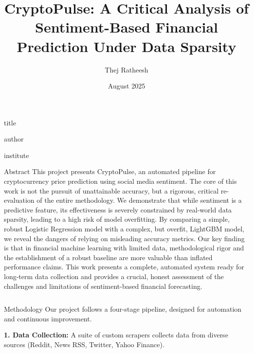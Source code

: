 \documentclass[final]{beamer}
\title{CryptoPulse: A Critical Analysis of Sentiment-Based Financial Prediction Under Data Sparsity}
\author{Thej Ratheesh}
\institute{University College Dublin, School of Mathematics and Statistics}
\date{August 2025}
\begin{document}
\begin{frame}[t]
  \begin{beamercolorbox}[wd=\linewidth, center]{title}
    \inserttitle
  \end{beamercolorbox}
  \begin{beamercolorbox}[wd=\linewidth, center]{author}
    \insertauthor
  \end{beamercolorbox}
  \begin{beamercolorbox}[wd=\linewidth, center]{institute}
    \insertinstitute
  \end{beamercolorbox}

  \vspace{0.5cm}

  \begin{block}{Abstract}
    \small
    This project presents CryptoPulse, an automated pipeline for cryptocurrency price prediction using social media sentiment. The core of this work is not the pursuit of unattainable accuracy, but a rigorous, critical re-evaluation of the entire methodology. We demonstrate that while sentiment is a predictive feature, its effectiveness is severely constrained by real-world data sparsity, leading to a high risk of model overfitting. By comparing a simple, robust Logistic Regression model with a complex, but overfit, LightGBM model, we reveal the dangers of relying on misleading accuracy metrics. Our key finding is that in financial machine learning with limited data, methodological rigor and the establishment of a robust baseline are more valuable than inflated performance claims. This work presents a complete, automated system ready for long-term data collection and provides a crucial, honest assessment of the challenges and limitations of sentiment-based financial forecasting.
  \end{block}

  \vspace{0.5cm}

  \begin{columns}[T]
    \begin{column}{0.4\linewidth}
      \begin{block}{Methodology}
        \small
        Our project follows a four-stage pipeline, designed for automation and continuous improvement.

        \textbf{1. Data Collection:}
        A suite of custom scrapers collects data from diverse sources (Reddit, News RSS, Twitter, Yahoo Finance).


\end{block}
\end{column}
\end{columns}
\end{frame}
\end{document}
